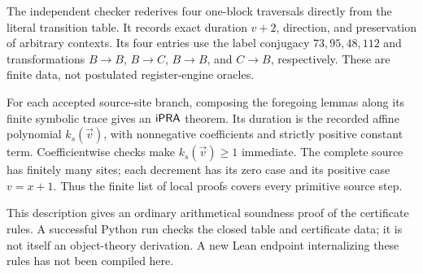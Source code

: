 The independent checker rederives four one-block traversals directly from
the literal transition table. It records exact duration $v+2$, direction,
and preservation of arbitrary contexts. Its four entries use the label
conjugacy $73,95,48,112$ and transformations $B\to B$, $B\to C$,
$B\to B$, and $C\to B$, respectively. These are finite data, not
postulated register-engine oracles.

For each accepted source-site branch, composing the foregoing lemmas
along its finite symbolic trace gives an $\mathsf{iPRA}$ theorem. Its duration is
the recorded affine polynomial $k_s(\vec v)$, with nonnegative coefficients
and strictly positive constant term. Coefficientwise checks make
$k_s(\vec v)\ge1$ immediate. The complete source has finitely many sites;
each decrement has its zero case and its positive case $v=x+1$. Thus the
finite list of local proofs covers every primitive source step.

This description gives an ordinary arithmetical soundness proof of the
certificate rules. A successful Python run checks the closed table and
certificate data; it is not itself an object-theory derivation. A new Lean
endpoint internalizing these rules has not been compiled here.

